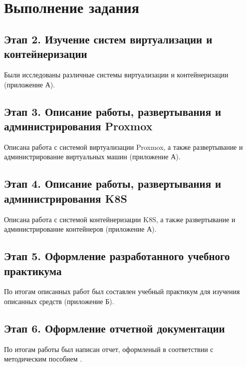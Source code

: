 \section{Выполнение задания}

\subsection{Этап 2. Изучение систем виртуализации и контейнеризации}
Были исследованы различные системы виртуализации и контейнеризации (приложение А).

\subsection{Этап 3. Описание работы, развертывания и администрирования Proxmox}
Описана работа с системой виртуализации Proxmox, а также развертывание и администрирование виртуальных машин (приложение А).

\subsection{Этап 4. Описание работы, развертывания и администрирования K8S}
Описана работа с системой контейнеризации K8S, а также развертывание и администрирование контейнеров (приложение А).

\subsection{Этап 5. Оформление разработанного учебного практикума}
По итогам описанных работ был составлен учебный практикум для изучения описанных средств (приложение Б).

\subsection{Этап 6. Оформление отчетной документации}
По итогам работы был написан отчет, оформленый в соответствии с методическим пособием \cite{markina}.


\clearpage

